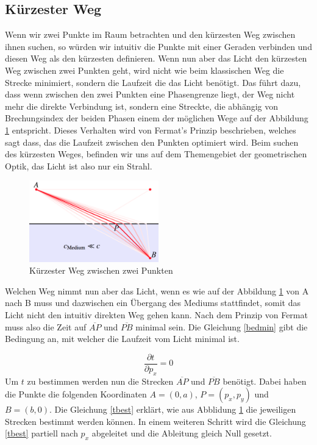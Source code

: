 \begin{refsection}
\section{Kürzester Weg}
Wenn wir zwei Punkte im Raum betrachten und den kürzesten Weg zwischen ihnen suchen, so würden wir intuitiv die Punkte mit einer Geraden verbinden und diesen Weg als den kürzesten definieren. Wenn nun aber das Licht den kürzesten Weg zwischen zwei Punkten geht, wird nicht wie beim klassischen Weg die Strecke minimiert, sondern die Laufzeit die das Licht benötigt. Das führt dazu, dass wenn zwischen den zwei Punkten eine Phasengrenze liegt, der Weg nicht mehr die direkte Verbindung ist, sondern eine Streckte, die abhängig von Brechungsindex der beiden Phasen einem der möglichen Wege auf der Abbildung \ref{fig:weg} entspricht. Dieses Verhalten wird von Fermat's Prinzip beschrieben, welches sagt dass, das die Laufzeit zwischen den Punkten optimiert wird. Beim suchen des kürzesten Weges, befinden wir uns auf dem Themengebiet der geometrischen Optik, das Licht ist also nur ein Strahl. 
\begin{figure}
  \centering
  \includegraphics[width=0.5\textwidth]{adaptiv/images/Weg}
  \caption{Kürzester Weg zwischen zwei Punkten}
  \label{fig:weg}
\end{figure}
Welchen Weg nimmt nun aber das Licht, wenn es wie auf der Abbildung \ref{fig:weg} von A nach B muss und dazwischen ein Übergang des Mediums stattfindet, somit das Licht nicht den intuitiv direkten Weg gehen kann. Nach dem Prinzip von Fermat muss also die Zeit auf $\overline{AP}$ und $\overline{PB}$ minimal sein. Die Gleichung \eqref{bedmin} gibt die Bedingung an, mit welcher die Laufzeit vom Licht minimal ist.

\begin{equation}\label{bedmin}
\dfrac{\partial t}{\partial p_{x}}=0
\end{equation}
Um $t$ zu bestimmen werden nun die Strecken $\overline{AP}$ und $\overline{PB}$ benötigt. Dabei haben die Punkte die folgenden Koordinaten $A = (0,a)$, $P=(p_{x},p_{y})$ und $B=(b,0)$. Die Gleichung \eqref{tbest} erklärt, wie aus Abblidung \ref{fig:weg} die jeweiligen Strecken bestimmt werden können. In einem weiteren Schritt wird die Gleichung \eqref{tbest} partiell nach $p_{x}$ abgeleitet und die Ableitung gleich Null gesetzt.


\end{refsection}
